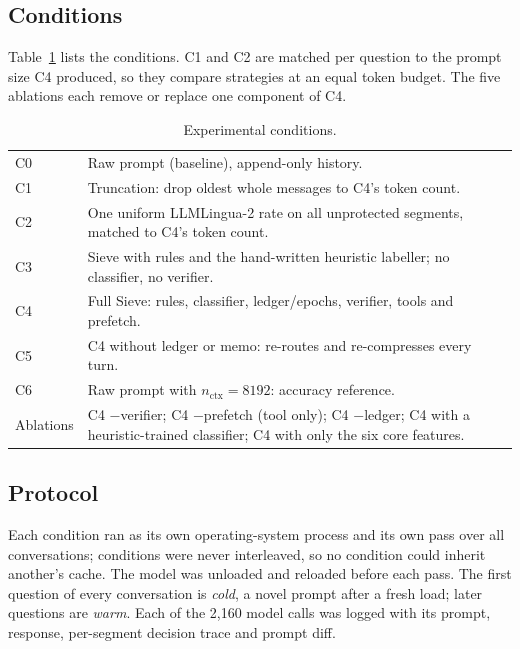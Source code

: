 \documentclass[journal]{IEEEtran}
\begin{document}
\subsection{Conditions}
Table~\ref{tab:cond} lists the conditions. C1 and C2 are matched per question to the prompt size C4 produced, so they compare
strategies at an equal token budget. The five ablations each remove or replace one component of C4.
\begin{table}[t]\centering\caption{Experimental conditions.}\label{tab:cond}\footnotesize\setlength{\tabcolsep}{3pt}
\begin{tabular}{lp{}}\toprule
C0 & Raw prompt (baseline), append-only history.\\
C1 & Truncation: drop oldest whole messages to C4's token count.\\
C2 & One uniform LLMLingua-2 rate on all unprotected segments, matched to C4's token count.\\
C3 & Sieve with rules and the hand-written heuristic labeller; no classifier, no verifier.\\
C4 & Full Sieve: rules, classifier, ledger/epochs, verifier, tools and prefetch.\\
C5 & C4 without ledger or memo: re-routes and re-compresses every turn.\\
C6 & Raw prompt with $n_\text{ctx}=8192$: accuracy reference.\\\midrule
Ablations & C4 $-$verifier; C4 $-$prefetch (tool only); C4 $-$ledger; C4 with a heuristic-trained classifier; C4 with only the six core features.\\
\bottomrule\end{tabular}\end{table}

\subsection{Protocol}
Each condition ran as its own operating-system process and its own pass over all conversations; conditions were never interleaved,
so no condition could inherit another's cache. The model was unloaded and reloaded before each pass. The first question of every
conversation is \emph{cold}, a novel prompt after a fresh load; later questions are \emph{warm}. Each of the 2,160 model
calls was logged with its prompt, response, per-segment decision trace and prompt diff.
\end{document}
